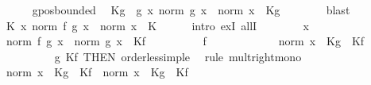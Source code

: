 \begin{isabellebody}
\ \ \ \ \isamarkupfalse%
\ g{\isachardot}{\kern0pt}pos{\isacharunderscore}{\kern0pt}bounded\ \isamarkupfalse%
\ Kg\ \ g{\isacharcolon}{\kern0pt}\ {\isachardoublequoteopen}{\isasymAnd}x{\isachardot}{\kern0pt}\ norm\ {\isacharparenleft}{\kern0pt}g\ x{\isacharparenright}{\kern0pt}\ {\isasymle}\ norm\ x\ {\isacharasterisk}{\kern0pt}\ Kg{\isachardoublequoteclose}\isanewline
\ \ \ \ \ \ \isamarkupfalse%
\ blast\isanewline
\ \ \ \ \isamarkupfalse%
\ {\isachardoublequoteopen}{\isasymexists}K{\isachardot}{\kern0pt}\ {\isasymforall}x{\isachardot}{\kern0pt}\ norm\ {\isacharparenleft}{\kern0pt}f\ {\isacharparenleft}{\kern0pt}g\ x{\isacharparenright}{\kern0pt}{\isacharparenright}{\kern0pt}\ {\isasymle}\ norm\ x\ {\isacharasterisk}{\kern0pt}\ K{\isachardoublequoteclose}\isanewline
\ \ \ \ \isamarkupfalse%
\ {\isacharparenleft}{\kern0pt}intro\ exI\ allI{\isacharparenright}{\kern0pt}\isanewline
\ \ \ \ \ \ \isamarkupfalse%
\ x\isanewline
\ \ \ \ \ \ \isamarkupfalse%
\ {\isachardoublequoteopen}norm\ {\isacharparenleft}{\kern0pt}f\ {\isacharparenleft}{\kern0pt}g\ x{\isacharparenright}{\kern0pt}{\isacharparenright}{\kern0pt}\ {\isasymle}\ norm\ {\isacharparenleft}{\kern0pt}g\ x{\isacharparenright}{\kern0pt}\ {\isacharasterisk}{\kern0pt}\ Kf{\isachardoublequoteclose}\isanewline
\ \ \ \ \ \ \ \ \isamarkupfalse%
\ f\ \isacommand{{\isachardot}{\kern0pt}}\isamarkupfalse%
\isanewline
\ \ \ \ \ \ \isamarkupfalse%
\ \isamarkupfalse%
\ {\isachardoublequoteopen}{\isasymdots}\ {\isasymle}\ {\isacharparenleft}{\kern0pt}norm\ x\ {\isacharasterisk}{\kern0pt}\ Kg{\isacharparenright}{\kern0pt}\ {\isacharasterisk}{\kern0pt}\ Kf{\isachardoublequoteclose}\isanewline
\ \ \ \ \ \ \ \ \isamarkupfalse%
\ g\ Kf\ {\isacharbrackleft}{\kern0pt}THEN\ order{\isacharunderscore}{\kern0pt}less{\isacharunderscore}{\kern0pt}imp{\isacharunderscore}{\kern0pt}le{\isacharbrackright}{\kern0pt}\ \isamarkupfalse%
\ {\isacharparenleft}{\kern0pt}rule\ mult{\isacharunderscore}{\kern0pt}right{\isacharunderscore}{\kern0pt}mono{\isacharparenright}{\kern0pt}\isanewline
\ \ \ \ \ \ \isamarkupfalse%
\ \isamarkupfalse%
\ {\isachardoublequoteopen}{\isacharparenleft}{\kern0pt}norm\ x\ {\isacharasterisk}{\kern0pt}\ Kg{\isacharparenright}{\kern0pt}\ {\isacharasterisk}{\kern0pt}\ Kf\ {\isacharequal}{\kern0pt}\ norm\ x\ {\isacharasterisk}{\kern0pt}\ {\isacharparenleft}{\kern0pt}Kg\ {\isacharasterisk}{\kern0pt}\ Kf{\isacharparenright}{\kern0pt}{\isachardoublequoteclose}\isanewline

\end{isabellebody}
